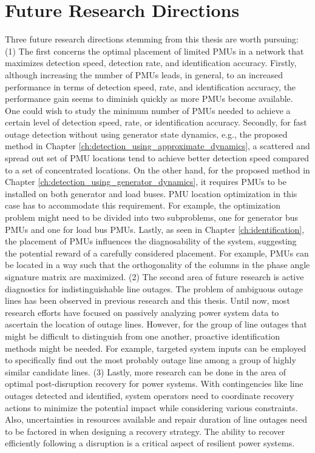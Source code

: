 \section{Future Research Directions}
Three future research directions stemming from this thesis are worth pursuing: (1) The first concerns the optimal placement of limited PMUs in a network that maximizes detection speed, detection rate, and identification accuracy. Firstly, although increasing the number of PMUs leads, in general, to an increased performance in terms of detection speed, rate, and identification accuracy, the performance gain seems to diminish quickly as more PMUs become available. One could wish to study the minimum number of PMUs needed to achieve a certain level of detection speed, rate, or identification accuracy. Secondly, for fast outage detection without using generator state dynamics, e.g., the proposed method in Chapter \ref{ch:detection_using_approximate_dynamics}, a scattered and spread out set of PMU locations tend to achieve better detection speed compared to a set of concentrated locations. On the other hand, for the proposed method in Chapter \ref{ch:detection_using_generator_dynamics}, it requires PMUs to be installed on both generator and load buses. PMU location optimization in this case has to accommodate this requirement. For example, the optimization problem might need to be divided into two subproblems, one for generator bus PMUs and one for load bus PMUs. Lastly, as seen in Chapter \ref{ch:identification}, the placement of PMUs influences the diagnosability of the system, suggesting the potential reward of a carefully considered placement. For example, PMUs can be located in a way such that the orthogonality of the columns in the phase angle signature matrix are maximized. (2) The second area of future research is active diagnostics for indistinguishable line outages. The problem of ambiguous outage lines has been observed in previous research and this thesis. Until now, most research efforts have focused on passively analyzing power system data to ascertain the location of outage lines. However, for the group of line outages that might be difficult to distinguish from one another, proactive identification methods might be needed. For example, targeted system inputs can be employed to specifically find out the most probably outage line among a group of highly similar candidate lines. (3) Lastly, more research can be done in the area of optimal post-disruption recovery for power systems. With contingencies like line outages detected and identified, system operators need to coordinate recovery actions to minimize the potential impact while considering various constraints. Also, uncertainties in resources available and repair duration of line outages need to be factored in when designing a recovery strategy. The ability to recover efficiently following a disruption is a critical aspect of resilient power systems. 


